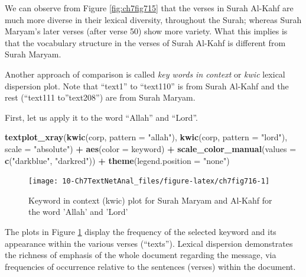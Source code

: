 \documentclass[
]{article}
\newenvironment{Shaded}{\begin{snugshade}}{\end{snugshade}}
\newcommand{\AttributeTok}[1]{\textcolor[rgb]{0.13,0.29,0.53}{#1}}
\newcommand{\FunctionTok}[1]{\textcolor[rgb]{0.13,0.29,0.53}{\textbf{#1}}}
\newcommand{\NormalTok}[1]{#1}
\newcommand{\SpecialCharTok}[1]{\textcolor[rgb]{0.81,0.36,0.00}{\textbf{#1}}}
\newcommand{\StringTok}[1]{\textcolor[rgb]{0.31,0.60,0.02}{#1}}
\begin{document}
We can observe from Figure \ref{fig:ch7fig715} that the verses in Surah Al-Kahf are much more diverse in their lexical diversity, throughout the Surah; whereas Surah Maryam's later verses (after verse 50) show more variety. What this implies is that the vocabulary structure in the verses of Surah Al-Kahf is different from Surah Maryam.

Another approach of comparison is called \emph{key words in context} or \emph{kwic} lexical dispersion plot. Note that ``text1'' to ``text110'' is from Surah Al-Kahf and the rest (``text111 to''text208'') are from Surah Maryam.

First, let us apply it to the word ``Allah'' and ``Lord''.

\begin{Shaded}
\begin{Highlighting}[]
\FunctionTok{textplot\_xray}\NormalTok{(}\FunctionTok{kwic}\NormalTok{(corp, }\AttributeTok{pattern =} \StringTok{"allah"}\NormalTok{), }\FunctionTok{kwic}\NormalTok{(corp, }\AttributeTok{pattern =} \StringTok{"lord"}\NormalTok{),}
              \AttributeTok{scale =} \StringTok{"absolute"}\NormalTok{) }\SpecialCharTok{+}
              \FunctionTok{aes}\NormalTok{(}\AttributeTok{color =}\NormalTok{ keyword) }\SpecialCharTok{+} 
              \FunctionTok{scale\_color\_manual}\NormalTok{(}\AttributeTok{values =} \FunctionTok{c}\NormalTok{(}\StringTok{"darkblue"}\NormalTok{, }\StringTok{"darkred"}\NormalTok{)) }\SpecialCharTok{+}
              \FunctionTok{theme}\NormalTok{(}\AttributeTok{legend.position =} \StringTok{"none"}\NormalTok{)}
\end{Highlighting}
\end{Shaded}

\begin{figure}

{\centering \texttt{[image: 10-Ch7TextNetAnal\_files/figure-latex/ch7fig716-1]} 

}

\caption{Keyword in context (kwic) plot for Surah Maryam and Al-Kahf for the word 'Allah' and 'Lord'}\label{fig:ch7fig716}
\end{figure}

The plots in Figure \ref{fig:ch7fig716} display the frequency of the selected keyword and its appearance within the various verses (``texts''). Lexical dispersion demonstrates the richness of emphasis of the whole document regarding the message, via frequencies of occurrence relative to the sentences (verses) within the document.
\end{document}
